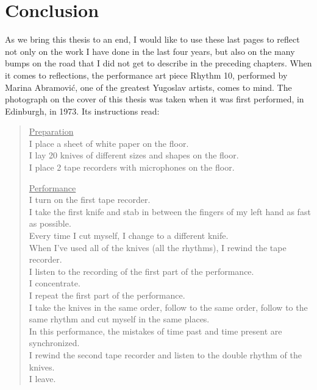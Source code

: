 \chapter{Conclusion}
\label{ch:conclusion}
 
As we bring this thesis to an end, I would like to use these last pages to
reflect not only on the work I have done in the last four years, but also on the
many bumps on the road that I did not get to describe in the preceding chapters.
When it comes to reflections, the  performance art piece Rhythm 10, performed by
Marina Abramovi\'c,  one of the greatest Yugoslav artists, comes to mind. The
photograph on the cover of this thesis was taken when it was first performed, in
Edinburgh, in 1973. Its instructions read:

\begin{quote}
    \underline{Preparation} \\[1\jot]
    I place a sheet of white paper on the floor.\\
    I lay 20 knives of different sizes and shapes on the floor.\\
    I place 2 tape recorders with microphones on the floor.
    
    \underline{Performance} \\[1\jot]
    I turn on the first tape recorder.\\
    I take the first knife and stab in between the fingers of my left hand as
    fast as possible.\\
    Every time I cut myself, I change to a different knife. \\
    When I've used all of the knives (all the rhythms), I rewind the tape
    recorder. \\ 
    I listen to the recording of the first part of the performance. \\ I
    concentrate. \\
    I repeat the first part of the performance. \\
    I take the knives in the same order, follow to the same order, follow to the
    same rhythm and cut myself in the same places. \\
    In this performance, the mistakes of time past and time present are
    synchronized.\\
    I rewind the second tape recorder and listen to the double rhythm of the
    knives.\\
    I leave.
\end{quote}

